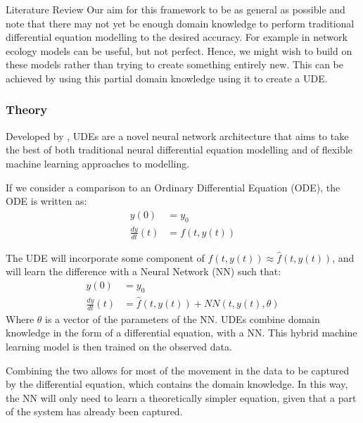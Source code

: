 \documentclass[12pt]{amsart}
\begin{document}
\begin{section}{Literature Review}
        Our aim for this framework to be as general as possible and note that there may not yet be enough domain knowledge to perform traditional differential equation modelling to the desired accuracy. For example in network ecology models can be useful, but not perfect. Hence, we might wish to build on these models rather than trying to create something entirely new. This can be achieved by using this partial domain knowledge using it to create a UDE\cite{SciML_C_Rak}.

        \subsubsection{Theory}

            Developed by \cite{SciML_C_Rak}, UDEs are a novel neural network architecture that aims to take the best of both traditional neural differential equation modelling and of flexible machine learning approaches to modelling. 

            If we consider a comparison to an Ordinary Differential Equation (ODE), the ODE is written as:
            \begin{align}
                y(0) &= y_0 \\
                \frac{dy}{dt}(t)&=f(t,y(t))
            \end{align}
            
            The UDE will incorporate some component of $f(t,y(t))\approx \hat f(t,y(t))$, and will learn the difference with a Neural Network (NN) such that:
            \begin{align}
                \label{UDE}
                y(0) &= y_0 \\
                \frac{dy}{dt}(t)&=\hat f(t,y(t))+NN(t,y(t), \theta)
            \end{align}
            Where $\theta$ is a vector of the parameters of the NN.
            UDEs combine domain knowledge in the form of a differential equation, with a NN. This hybrid machine learning model is then trained on the observed data.
            
            Combining the two allows for most of the movement in the data to be captured by the differential equation, which contains the domain knowledge. In this way, the NN will only need to learn a theoretically simpler equation, given that a part of the system has already been captured. 
            

\end{section}
\end{document}
